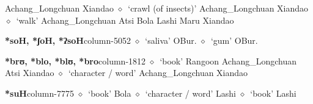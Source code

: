          Achang\_Longchuan 
\hspace{1ex}
         Xiandao 
\hspace{1ex}
         $\diamond$~`crawl (of insects)'
         Achang\_Longchuan 
\hspace{1ex}
         Xiandao 
\hspace{1ex}
         $\diamond$~`walk'
         Achang\_Longchuan 
\hspace{1ex}
         Atsi 
\hspace{1ex}
         Bola 
\hspace{1ex}
         Lashi 
\hspace{1ex}
         Maru 
\hspace{1ex}
         Xiandao 
  \item {\footnotesize \textbf{*soH, *ʃoH, *ʔsoH}}{\tiny column-5052}
         $\diamond$~`saliva'
         OBur. 
\hspace{1ex}
         $\diamond$~`gum'
         OBur. 
  \item {\footnotesize \textbf{*brʊ, *blo, *blʊ, *bro}}{\tiny column-1812}
         $\diamond$~`book'
         Rangoon 
\hspace{1ex}
         Achang\_Longchuan 
\hspace{1ex}
         Atsi 
\hspace{1ex}
         Xiandao 
\hspace{1ex}
         $\diamond$~`character / word'
         Achang\_Longchuan 
\hspace{1ex}
         Xiandao 
  \item {\footnotesize \textbf{*suH}}{\tiny column-7775}
         $\diamond$~`book'
         Bola 
\hspace{1ex}
         $\diamond$~`character / word'
         Lashi 
\hspace{1ex}
         $\diamond$~`book'
         Lashi 
